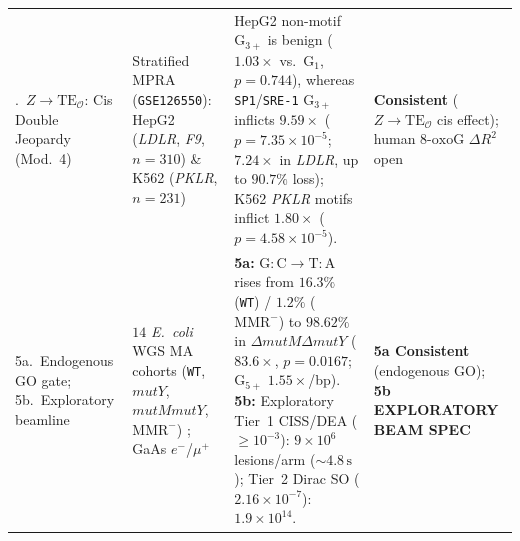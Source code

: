 \documentclass[10pt,letterpaper]{article}
\theoremstyle{plain}
\theoremstyle{definition}
\newcommand{\oxog}{\text{8-oxoG}}
\begin{document}
\begin{table}[!t]
\begin{tabularx}{\textwidth}{@{}>{\raggedright\arraybackslash}p{2.35cm}>{\raggedright\arraybackslash}p{2.65cm}>{\raggedright\arraybackslash}X>{\raggedright\arraybackslash}p{2.55cm}@{}}
\addlinespace[2pt]
4.\ $Z \to \mathrm{TE}_{\mathcal{O}}$: Cis Double Jeopardy (Mod.~4) & Stratified MPRA (\texttt{GSE126550}): HepG2 (\emph{LDLR}, \emph{F9}, $n=310$) \& K562 (\emph{PKLR}, $n=231$) \cite{kircher2019natcommun} & HepG2 non-motif $\mathrm{G}_{3+}$ is benign ($1.03\times$ vs.\ $\mathrm{G}_1$, $p=0.744$), whereas \texttt{SP1}/\texttt{SRE-1} $\mathrm{G}_{3+}$ inflicts $9.59\times$ ($p=7.35\times 10^{-5}$; $7.24\times$ in \emph{LDLR}, up to $90.7\%$ loss); K562 \emph{PKLR} motifs inflict $1.80\times$ ($p=4.58\times 10^{-5}$). & \textbf{Consistent} ($Z\to\mathrm{TE}_{\mathcal{O}}$ cis effect); human $\oxog$ $\Delta R^2$ open \\
\addlinespace[2pt]
5a.\ Endogenous GO gate; 5b.\ Exploratory beamline & $14$ \emph{E.\ coli} WGS MA cohorts (\texttt{WT}, $\textit{mutY}$, $\textit{mutM}\textit{mutY}$, $\mathrm{MMR}^-$) \cite{foster2015pnas,garushyants2024gbe}; GaAs $e^-$/$\mu^+$ & \textbf{5a:} $\mathrm{G{:}C\to T{:}A}$ rises from $16.3\%$ (\texttt{WT}) / $1.2\%$ ($\mathrm{MMR}^-$) to $98.62\%$ in $\Delta\textit{mutM}\Delta\textit{mutY}$ ($83.6\times$, $p=0.0167$; $\mathrm{G}_{5+}$ $1.55\times$/bp). \textbf{5b:} Exploratory Tier~1 CISS/DEA ($\ge 10^{-3}$): $9\times 10^6$ lesions/arm ($\sim 4.8\,\mathrm{s}$); Tier~2 Dirac SO ($2.16\times 10^{-7}$): $1.9\times 10^{14}$. & \textbf{5a Consistent} (endogenous GO); \textbf{5b EXPLORATORY BEAM SPEC} \\
\bottomrule
\end{tabularx}
\end{table}
\end{document}
